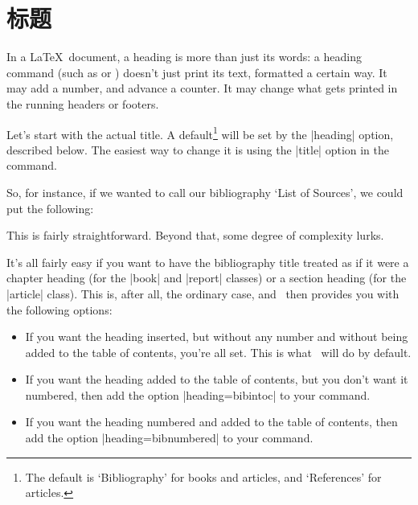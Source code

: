 \section{标题}

In a \LaTeX\ document, a heading is more than just its words: a
heading command (such as  or ) doesn't just
print its text, formatted a certain way. It may add a number, and
advance a counter. It may change what gets printed in the running
headers or footers.

 Let's start with the actual title. A
default\footnote{The default is `Bibliography' for books and articles,
  and `References' for articles.} will be set by the |heading| option,
described below. The easiest way to change it is using the |title|
option in the  command.

So, for instance, if we wanted to call our bibliography `List of
Sources', we could put the following:
\begin{center}
\end{center}

This is fairly straightforward. Beyond that, some degree of complexity
lurks.

It's all fairly easy if you want to have the bibliography title
treated as if it were a chapter heading (for the |book| and |report|
classes) or a section heading (for the |article| class). This is,
after all, the ordinary case, and \biblatex\ then provides you with
the following options:
\begin{itemize}
\item If you want the heading inserted, but without any
  number and without being added to the table of contents, you're all
  set. This is what \biblatex\ will do by default.
\item If you want the heading added to the table of contents,
  but you don't want it numbered, then add the option
  |heading=bibintoc| to your  command.
\item If you want the heading numbered and added to the table
  of contents, then add the option |heading=bibnumbered| to your
   command.
\end{itemize}

